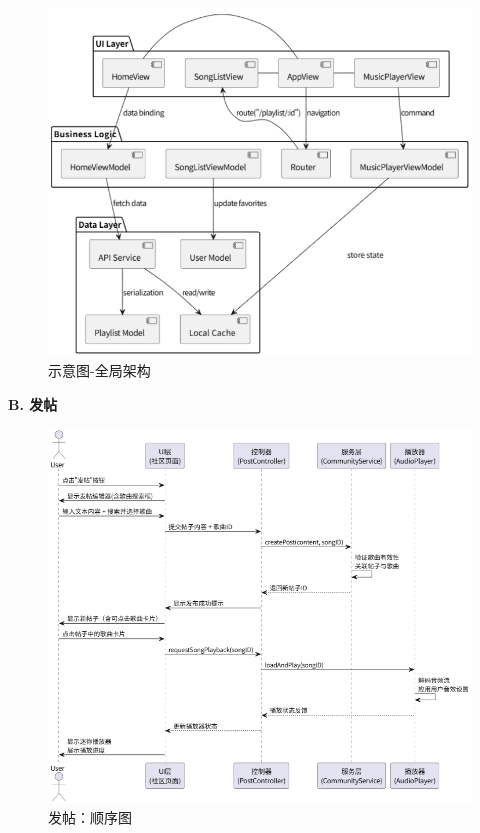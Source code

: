 \documentclass{base}
\numberwithin{figure}{section} %
\begin{document}
\begin{figure}[H]
    \centering
    \includegraphics[width=\textwidth]{images/5-7.png}
    \caption{示意图-全局架构}
\end{figure}

\textbf{B. 发帖}

\begin{figure}[H]
    \centering
    \includegraphics[width=\textwidth]{images/post-1.png}
    \caption{发帖：顺序图}
\end{figure}
\end{document}
